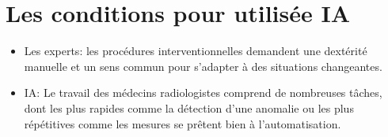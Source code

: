 \section{Les conditions pour utilisée IA}
\begin{itemize}
    \item Les experts:
            les procédures interventionnelles demandent une dextérité
            manuelle et un sens commun pour s'adapter à des situations changeantes.
        
    \item IA:
            Le travail des médecins radiologistes comprend de nombreuses tâches,
            dont les plus rapides comme la détection d'une anomalie ou les plus
            répétitives comme les mesures se prêtent bien à l'automatisation.\mybox
        
\end{itemize}
